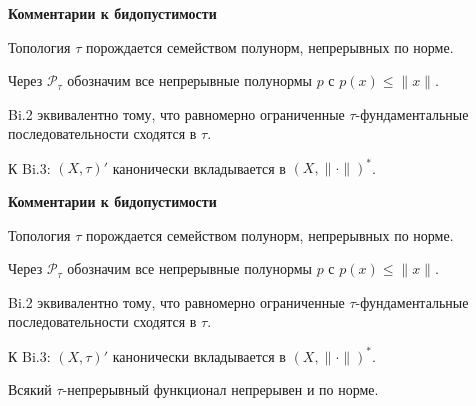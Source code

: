 \documentclass[11pt]{article}
\begin{document}
\begin{center}
{\color{notaeYELLOW}\bfseries\fontsize{44}{52}\selectfont Комментарии к бидопустимости}
\end{center}
\vspace*{\fill}
\begin{center}
\fontsize{36}{43}\selectfont
\parbox{\linewidth}{\centering\noindent Топология $\tau$ порождается семейством полунорм, непрерывных по норме.
\par}\vspace{0.4in}
\parbox{\linewidth}{\centering\noindent Через $\mathcal{P}_\tau$ обозначим все непрерывные полунормы $p$ с $p(x)\le\|x\|$.
\par}\vspace{0.4in}
\parbox{\linewidth}{\centering\noindent Bi.2 эквивалентно тому, что равномерно ограниченные $\tau$-фундаментальные последовательности сходятся в $\tau$.
\par}\vspace{0.4in}
\parbox{\linewidth}{\centering\noindent К Bi.3: $(X,\tau)'$ канонически вкладывается в $(X,\|\cdot\|)^*$.
\par}\vspace{0.4in}
\end{center}
\vspace*{\fill}

\newpage

\begin{center}
{\color{notaeYELLOW}\bfseries\fontsize{44}{52}\selectfont Комментарии к бидопустимости}
\end{center}
\vspace*{\fill}
\begin{center}
\fontsize{36}{43}\selectfont
\parbox{\linewidth}{\centering\noindent Топология $\tau$ порождается семейством полунорм, непрерывных по норме.
\par}\vspace{0.4in}
\parbox{\linewidth}{\centering\noindent Через $\mathcal{P}_\tau$ обозначим все непрерывные полунормы $p$ с $p(x)\le\|x\|$.
\par}\vspace{0.4in}
\parbox{\linewidth}{\centering\noindent Bi.2 эквивалентно тому, что равномерно ограниченные $\tau$-фундаментальные последовательности сходятся в $\tau$.
\par}\vspace{0.4in}
\parbox{\linewidth}{\centering\noindent К Bi.3: $(X,\tau)'$ канонически вкладывается в $(X,\|\cdot\|)^*$.
\par}\vspace{0.4in}
\parbox{\linewidth}{\centering\noindent Всякий $\tau$-непрерывный функционал непрерывен и по норме.
\par}\vspace{0.4in}
\end{center}
\vspace*{\fill}
\end{document}

